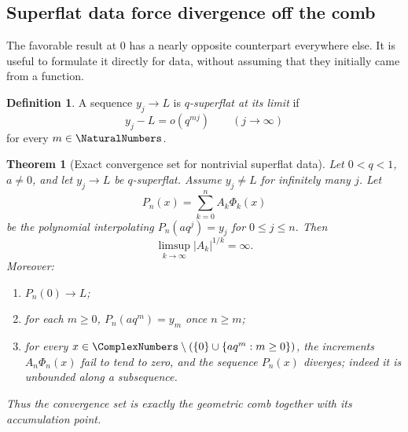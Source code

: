 \documentclass[11pt,a4paper,oneside]{article}
\newtheorem{theorem}{Theorem}[section]
\theoremstyle{definition}
\newtheorem{definition}[definition]{Definition}
\theoremstyle{remark}
\begin{document}
\subsection{Superflat data force divergence off the comb}

The favorable result at $0$ has a nearly opposite counterpart everywhere
else.  It is useful to formulate it directly for data, without assuming that
they initially came from a function.

\begin{definition}
A sequence $y_j\to L$ is \emph{$q$-superflat at its limit} if
\begin{equation}
 y_j-L=o(q^{mj})\qquad(j\to\infty)
 \label{eq:q-superflat}
\end{equation}
for every $m\in\NaturalNumbers$.
\end{definition}

\begin{theorem}[Exact convergence set for nontrivial superflat data]
\label{thm:superflat-divergence}
Let $0<q<1$, $a\ne0$, and let $y_j\to L$ be $q$-superflat.  Assume
$y_j\ne L$ for infinitely many $j$.  Let
\begin{equation}
 P_n(x)=\sum_{k=0}^n A_k\Phi_k(x)
 \label{eq:superflat-newton}
\end{equation}
be the polynomial interpolating $P_n(aq^j)=y_j$ for $0\le j\le n$.  Then
\begin{equation}
 \limsup_{k\to\infty}|A_k|^{1/k}=\infty.
 \label{eq:superexponential-A}
\end{equation}
Moreover:
\begin{enumerate}
\item $P_n(0)\to L$;
\item for each $m\ge0$, $P_n(aq^m)=y_m$ once $n\ge m$;
\item for every $x\in\ComplexNumbers\setminus(\{0\}\cup\{aq^m:m\ge0\})$, the increments
      $A_n\Phi_n(x)$ fail to tend to zero, and the sequence $P_n(x)$ diverges;
      indeed it is unbounded along a subsequence.
\end{enumerate}
Thus the convergence set is exactly the geometric comb together with its
accumulation point.
\end{theorem}
\end{document}
